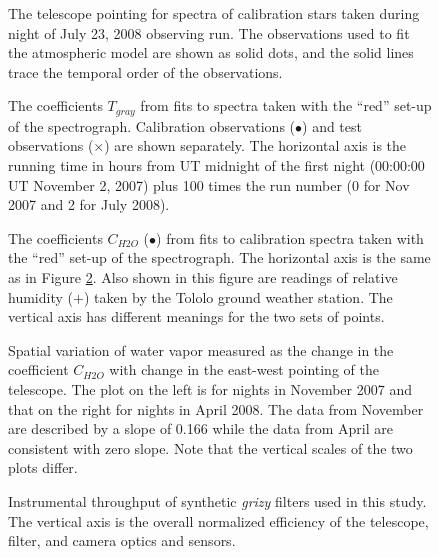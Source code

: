 \documentclass[manuscript]{aastex}
\begin{document}
\begin{figure}
\caption{The telescope pointing for spectra of calibration stars taken during night of July 23, 2008 observing run.
   The observations used to fit the atmospheric model are shown as solid dots, and the solid lines trace the temporal order of the observations. 
          \label{fig:calhadec}}
\end{figure}

\begin{figure}
\caption{The coefficients $T_{gray}$ from fits to spectra taken with the ``red'' set-up of the spectrograph. 
   Calibration observations ($\bullet$) and test observations ($\times$) are shown separately. 
   The horizontal axis is the running time in hours from UT midnight of the first night (00:00:00 UT November 2, 2007)
   plus 100 times the run number (0 for Nov 2007 and 2 for July 2008). 
          \label{fig:grays}}
\end{figure}

\begin{figure}
\caption{The coefficients $C_{H2O}$ ($\bullet$) from fits to calibration spectra taken with the ``red'' set-up of the spectrograph.
   The horizontal axis is the same as in Figure \ref{fig:grays}.
   Also shown in this figure are readings of relative humidity ($+$) taken by the Tololo ground weather station.
   The vertical axis has different meanings for the two sets of points.  
          \label{fig:allH2O}}
\end{figure}

\clearpage

\begin{figure}
\caption{Spatial variation of water vapor measured as the change in the coefficient $C_{H2O}$ with change in the east-west 
pointing of the telescope.  
The plot on the left is for nights in November 2007 and that on the right for nights in April 2008.  The data from November
are described by a slope of 0.166 while the data from April are consistent with zero slope.
Note that the vertical scales of the two plots differ.
\label{fig:H2OvsHA}}
\end{figure} 

\begin{figure}
\caption{Instrumental throughput of synthetic {\it grizy} filters used in this study.
   The vertical axis is the overall normalized efficiency of the telescope, filter, and camera optics and sensors. 
          \label{fig:LSSTbands}}
\end{figure}
\end{document}
